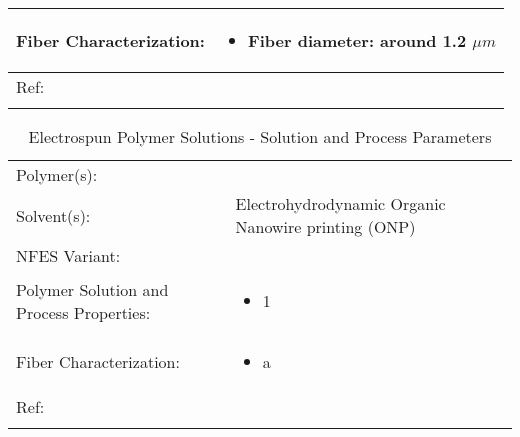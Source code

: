 \begin{table}[th]
\begin{center}
\begin{tabular}{
>{\raggedright\arraybackslash}p{}
>{\raggedright\arraybackslash}p{} }
\hline
Fiber Characterization: &
\begin{itemize}[leftmargin=*]
\item Fiber diameter: around 1.2 $\mu m$ 
\end{itemize} \\

\hline
Ref: & \cite{Liu2014} \\ %
\arrayrulecolor{black}\hline
\label{tbl:FloresCompare}
\end{tabular}
\end{center}
\end{table}

\begin{table}[th]
\caption{Electrospun Polymer Solutions - Solution and Process Parameters}
\begin{center}
\begin{tabular}{
>{\raggedright\arraybackslash}p{}
>{\raggedright\arraybackslash}p{} }

\hline
Polymer(s): &
 \\

\arrayrulecolor{lightgray}\hline
Solvent(s): &
Electrohydrodynamic Organic Nanowire printing (ONP) \\

\hline
NFES Variant: &
 \\

\hline
Polymer Solution and Process Properties: &
\begin{itemize}[leftmargin=*]
\item 1
\end{itemize} \\

\hline
Fiber Characterization: &
\begin{itemize}[leftmargin=*]
\item a
\end{itemize} \\

\hline
Ref: & \cite{Min2013} \\ %
\arrayrulecolor{black}\hline
\label{tbl:FloresCompare}
\end{tabular}
\end{center}
\end{table}

